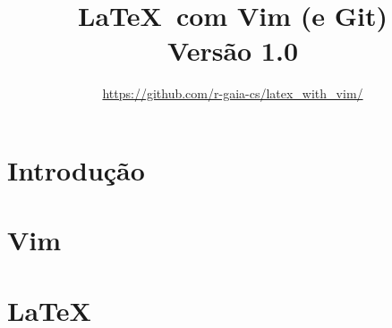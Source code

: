 \documentclass[12pt,a4paper,openright,twoside]{book}
\begin{document}
\title{\LaTeX\ com Vim (e Git) \\ \vspace*{4pt} \small{Versão 1.0}}
\author{\url{https://github.com/r-gaia-cs/latex_with_vim/}}
\maketitle

\frontmatter 



 

\tableofcontents 
\listoftables

\mainmatter 

\part{Introdu\c{c}\~{a}o}






\part{Vim}






\part{\LaTeX}















\end{document}
